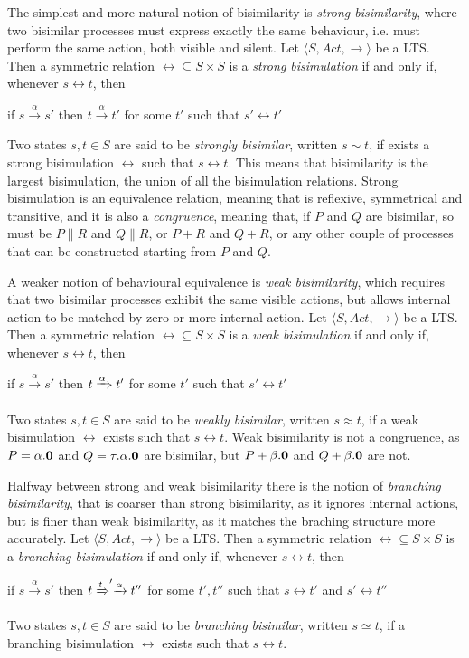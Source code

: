 The simplest and more natural notion of bisimilarity is \textit{strong bisimilarity}, where two bisimilar processes must express exactly the same behaviour, i.e. must perform the same action, both visible and silent.
Let $\langle S , Act, \rightarrow \rangle$ be a LTS. Then a symmetric relation $\rel \subseteq S \times S$ is a \textit{strong bisimulation} if and only if, whenever $s \rel t$, then 
\begin{center}
if $s \xrightarrow{\alpha} s'$ then $t \xrightarrow{\alpha} t'$ for some $t'$ such that $s' \rel t'$
\end{center}
Two states $s, t \in S$ are said to be \textit{strongly bisimilar}, written $s \sim t$, if exists a strong bisimulation $\rel$ such that $s \rel t$. This means that bisimilarity is the largest bisimulation, the union of all the bisimulation relations.
Strong bisimulation is an equivalence relation, meaning that is reflexive, symmetrical and transitive, and it is also a \textit{congruence}, meaning that, if $P$ and $Q$ are bisimilar, so must be $P\parallel R$ and $Q\parallel R$, or $P + R$ and $Q + R$, or any other couple of processes that can be constructed starting from $P$ and $Q$.



A weaker notion of behavioural equivalence is \textit{weak bisimilarity}, which requires that two bisimilar processes exhibit the same visible actions, but allows internal action to be matched by zero or more internal action.
Let $\langle S , Act, \rightarrow \rangle$ be a LTS. Then a symmetric relation $\rel \subseteq S \times S$ is a \textit{weak bisimulation} if and only if, whenever $s \rel t$, then 
\begin{center}
if $s \xrightarrow{\alpha} s'$ then $t \xRightarrow{\alpha} t'$ for some $t'$ such that $s' \rel t'$
\end{center}
Two states $s, t \in S$ are said to be \textit{weakly bisimilar}, written $s \approx t$, if a weak bisimulation $\rel$ exists such that $s \rel t$.  Weak bisimilarity is not a congruence, as $P = \alpha.\mathbf{0}$ and $Q = \tau.\alpha.\mathbf{0}$ are bisimilar, but $P + \beta.\mathbf{0}$ and $Q + \beta.\mathbf{0}$ are not.


Halfway between strong and weak bisimilarity there is the notion of \textit{branching bisimilarity}, that is coarser than strong bisimilarity, as it ignores internal actions, but is finer than weak bisimilarity, as it matches the braching structure more accurately.
Let $\langle S , Act, \rightarrow \rangle$ be a LTS. Then a symmetric relation $\rel \subseteq S \times S$ is a \textit{branching bisimulation} if and only if, whenever $s \rel t$, then 
\begin{center}
if $s \xrightarrow{\alpha} s'$ then $t \xRightarrow t' \xrightarrow{\alpha} t''$ for some $t', t''$ such that $s \rel t'$ and $s' \rel t''$
\end{center}
Two states $s, t \in S$ are said to be \textit{branching bisimilar}, written $s \simeq t$, if a branching bisimulation $\rel$ exists such that $s \rel t$.

